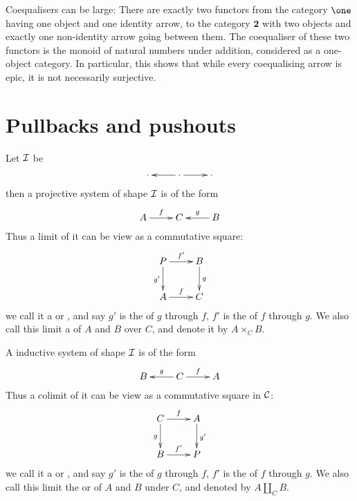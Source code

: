   \begin{exam}
    Coequalisers can be large: There are exactly two functors from the category $\one$ having one object and one identity arrow, to the category $\mathbf{2}$ with two objects and exactly one non-identity arrow going between them. The coequaliser of these two functors is the monoid of natural numbers under addition, considered as a one-object category. In particular, this shows that while every coequalising arrow is epic, it is not necessarily surjective.
  \end{exam}



\newpage\section{Pullbacks and pushouts}
  \begin{defn}
    Let ${\cal I}$ be
    \begin{displaymath}
      \xymatrix{
         \cdot&\cdot\ar[l]\ar[r]&\cdot
      }
    \end{displaymath}
    then a projective system of shape ${\cal I}$ is of the form
    \begin{displaymath}
      \xymatrix{
         A\ar[r]^{f}&C&B\ar[l]_{g}
      }
    \end{displaymath}
    Thus a limit of it can be view as a commutative square:
    \begin{displaymath}
      \xymatrix{
         P\ar[r]^{f'}\ar[d]_{g'}&B\ar[d]^{g}\\
         A\ar[r]^{f}&C
      }
    \end{displaymath}
    we call it a  or , and say $g'$ is the  of $g$ through $f$, $f'$ is the  of $f$ through $g$.
    We also call this limit a  of $A$ and $B$ over $C$, and denote it by $A\times_CB$.

    A inductive system of shape ${\cal I}$ is of the form
    \begin{displaymath}
      \xymatrix{
         B&C\ar[l]_{g}\ar[r]^{f}&A
      }
    \end{displaymath}
    Thus a colimit of it can be view as a commutative square in ${\cal C}$:
    \begin{displaymath}
      \xymatrix{
         C\ar[r]^{f}\ar[d]_{g}&A\ar[d]^{g'}\\
         B\ar[r]^{f'}&P
      }
    \end{displaymath}
    we call it a  or , and say $g'$ is the  of $g$ through $f$, $f'$ is the  of $f$ through $g$. We also call this limit the  or  of $A$ and $B$ under $C$, and denoted by $A\amalg_CB$.
  \end{defn}

